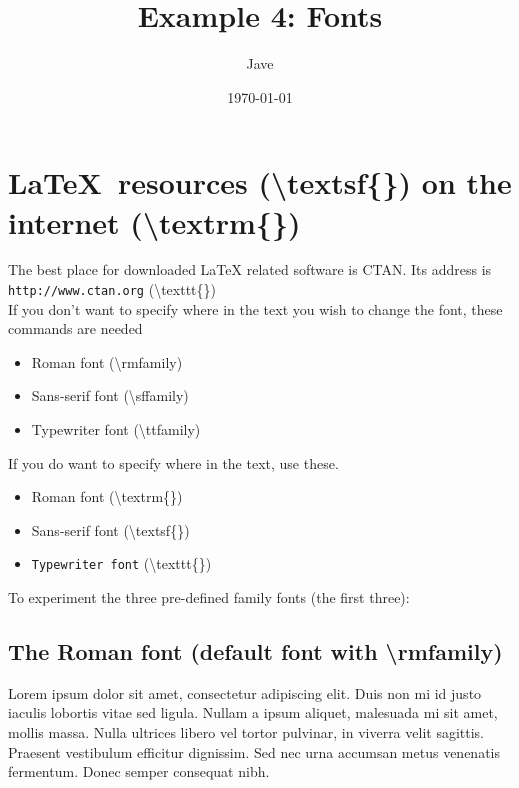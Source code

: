 \documentclass[letterpaper, 12pt]{article}
\begin{document}
\newcommand{\textttEx}{\textbackslash{}texttt\{\}}
\newcommand{\textsfEx}{\textbackslash{}textsf\{\}}
\newcommand{\textrmEx}{\textbackslash{}textrm\{\}}

\newcommand{\rmfamilyEx}{\textbackslash{}rmfamily}
\newcommand{\sffamilyEx}{\textbackslash{}sffamily}
\newcommand{\ttfamilyEx}{\textbackslash{}ttfamily}


\title{Example 4: Fonts}
\date{\today}
\author{Jave}
\maketitle

\section{\textsf{\LaTeX\ resources (\textsfEx) \textrm{on the internet (\textrmEx)} } }

The best place for downloaded LaTeX related software is CTAN\@.
Its address is \texttt{http://www.ctan.org} (\textttEx)\\

If you don't want to specify where in the text you wish to change the font, these commands are needed
\begin{itemize}
  \item \rmfamily Roman font (\rmfamilyEx)
  \item \sffamily Sans-serif font (\sffamilyEx)
  \item \ttfamily Typewriter font (\ttfamilyEx)
\end{itemize}

If you do want to specify where in the text, use these. 
\begin{itemize}
  \item \textrm{Roman font} (\textrmEx)
  \item \textsf{Sans-serif font} (\textsfEx)
  \item \texttt{Typewriter font} (\textttEx)
\end{itemize}

\noindent To experiment the three pre-defined family fonts (the first three):

  \subsection{The Roman font (default font with \rmfamilyEx)}
  \rmfamily
Lorem ipsum dolor sit amet, consectetur adipiscing elit. Duis non mi id justo iaculis lobortis vitae sed ligula. Nullam a ipsum aliquet, malesuada mi sit amet, mollis massa.
Nulla ultrices libero vel tortor pulvinar, in viverra velit sagittis. Praesent vestibulum efficitur dignissim. Sed nec urna accumsan metus venenatis fermentum. 
Donec semper consequat nibh. 
\end{document}
